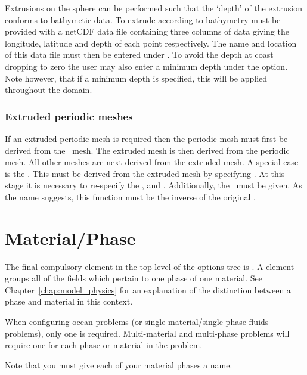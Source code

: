 Extrusions on the sphere can be performed such that the `depth' of the extrusion
conforms to bathymetic data. To extrude according
to bathymetry \fluidity must be provided with a netCDF data file containing
three columns of data giving the longitude, latitude and depth
of each point respectively. The name and location of this data file must then be
entered under .
To avoid the depth at coast dropping to zero the user may also enter a minimum
depth under the  option. Note however, that
if a minimum depth is specified, this will be applied throughout the domain.

\subsubsection{Extruded periodic meshes}\label{sect:extrudedperiodic}

If an extruded periodic mesh is required then the periodic mesh must first
be derived from the \ mesh. The extruded mesh is then
derived from the periodic mesh. All other meshes are next derived from the
extruded mesh. A special case is the . This must be
derived from the extruded mesh by specifying
. At this stage it
is necessary to re-specify the ,
 and . Additionally, the
\ must be given. As the name suggests, this
function must be the inverse of the original .


\section{Material/Phase}
The final compulsory element in the top level of the options tree is
.  A  element groups all
of the fields which pertain to one phase of one material. See
Chapter~\ref{chap:model_physics} for an explanation of the distinction
between a phase and material in this context.

When configuring ocean problems (or single material/single phase fluids
problems), only one  is required.  Multi-material
and multi-phase problems will require one  for each
phase or material in the problem.

Note that you must give each of your material phases a name.

